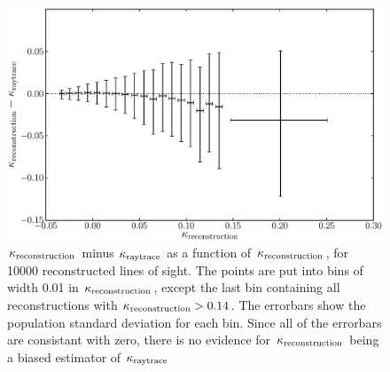\documentclass[useAMS,usenatbib]{mn2e}
\begin{document}
\begin{figure}
\includegraphics[width=\columnwidth]{isitbiased.eps}
\caption[Biased?]{$\kappa_{\rm reconstruction}$ minus $\kappa_{\rm raytrace}$ as a function of $\kappa_{\rm reconstruction}$, for 10000 reconstructed lines of sight. The points are put into bins of width 0.01 in $\kappa_{\rm reconstruction}$, except the last bin containing all reconstructions with $\kappa_{\rm reconstruction}>0.14$. The errorbars show the population standard deviation for each bin. Since all of the errorbars are consistant with zero, there is no evidence for $\kappa_{\rm reconstruction}$ being a biased estimator of $\kappa_{\rm raytrace}$}
\label{fig:isitbiased}
\end{figure}
\end{document}
